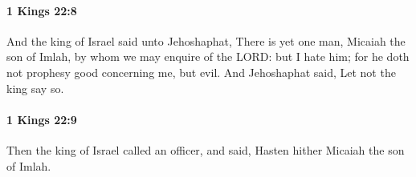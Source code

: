 		\paragraph{1 Kings 22:8} %
			\label{1KINGS-22-8}

			And the king of Israel said unto Jehoshaphat, There is yet one man, Micaiah the son of Imlah, by whom we may enquire of the LORD: but I hate him; for he doth not prophesy good concerning me, but evil. And Jehoshaphat said, Let not the king say so.


		\paragraph{1 Kings 22:9} %
			\label{1KINGS-22-9}

			Then the king of Israel called an officer, and said, Hasten hither Micaiah the son of Imlah.


